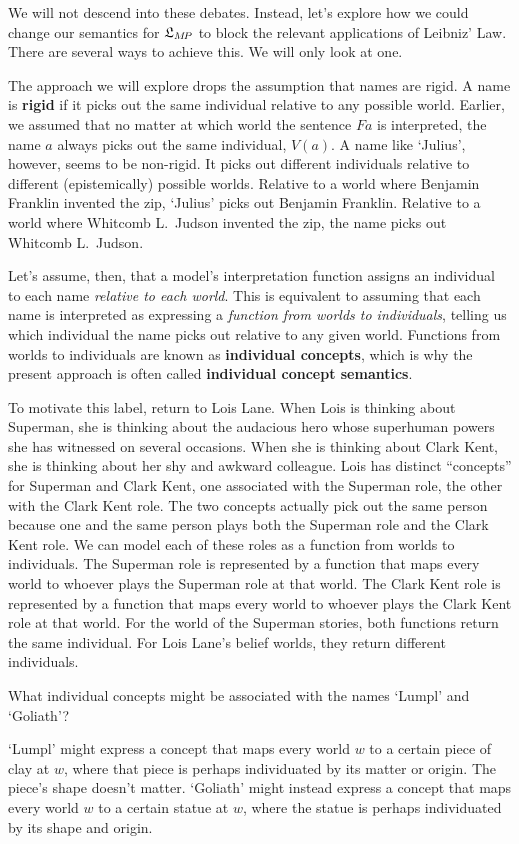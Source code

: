 We will not descend into these debates. Instead, let's explore how we could
change our semantics for $\mathfrak{L}_{M\!P}$ to block the relevant applications of
Leibniz' Law. There are several ways to achieve this. We will only look at one.

The approach we will explore drops the assumption that names are rigid. A name
is \textbf{rigid} if it picks out the same individual relative to any possible
world. Earlier, we assumed that no matter at which world the sentence $Fa$ is
interpreted, the name $a$ always picks out the same individual, $V(a)$. A name
like `Julius', however, seems to be non-rigid. It picks out different
individuals relative to different (epistemically) possible worlds. Relative to a
world where Benjamin Franklin invented the zip, `Julius' picks out Benjamin
Franklin. Relative to a world where Whitcomb L.\ Judson invented the zip, the
name picks out Whitcomb L.\ Judson.

Let's assume, then, that a model's interpretation function assigns an individual
to each name \emph{relative to each world}. This is equivalent to assuming that
each name is interpreted as expressing a \emph{function from worlds to
  individuals}, telling us which individual the name picks out relative to any
given world. Functions from worlds to individuals are known as
\textbf{individual concepts}, which is why the present approach is often called
\textbf{individual concept semantics}.

To motivate this label, return to Lois Lane. When Lois is thinking about
Superman, she is thinking about the audacious hero whose superhuman powers she
has witnessed on several occasions. When she is thinking about Clark Kent, she
is thinking about her shy and awkward colleague. Lois has distinct ``concepts''
for Superman and Clark Kent, one associated with the Superman role, the other
with the Clark Kent role. The two concepts actually pick out the same person
because one and the same person plays both the Superman role and the Clark Kent
role. We can model each of these roles as a function from worlds to individuals.
The Superman role is represented by a function that maps every world to whoever
plays the Superman role at that world. The Clark Kent role is represented by a
function that maps every world to whoever plays the Clark Kent role at that
world. For the world of the Superman stories, both functions return the same
individual. For Lois Lane's belief worlds, they return different individuals.

\begin{exercise}
  What individual concepts might be associated with the names `Lumpl' and
  `Goliath'?
\end{exercise}
\begin{solution}
  `Lumpl' might express a concept that maps every world $w$ to a certain piece
  of clay at $w$, where that piece is perhaps individuated by its matter or
  origin. The piece's shape doesn't matter. `Goliath' might instead express a concept that maps every world $w$ to a certain statue at $w$, where the statue is perhaps individuated by its shape and origin.
\end{solution}

